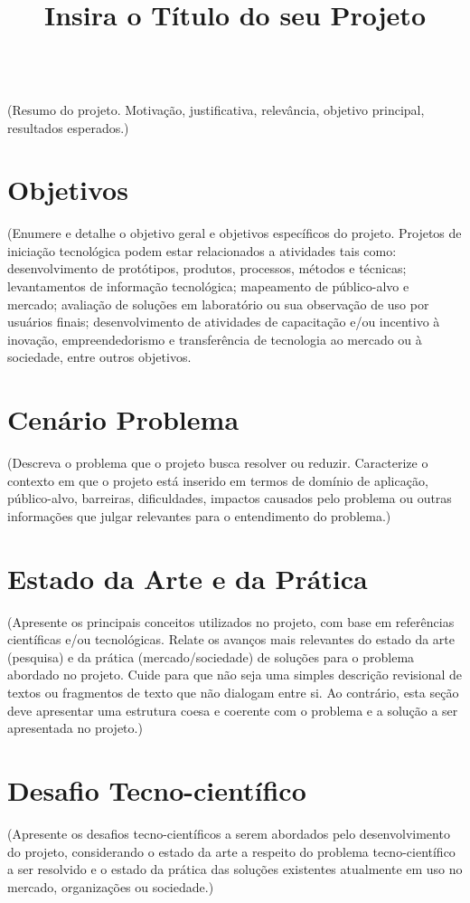 \documentclass[11pt]{article}
\title{Insira o Título do seu Projeto}
\makeatletter
\renewcommand{\maketitle}{\bgroup\setlength{\parindent}{11pt}
\begin{flushleft}
  \MakeUppercase{\textbf{\@title}}
\end{flushleft}\egroup
}
\renewenvironment{abstract}
 {\par\noindent\textbf{\abstractname}\\ \ignorespaces}
 {\par\medskip}
\makeatother
\begin{document}
\maketitle

\begin{abstract}
(Resumo do projeto. Motivação, justificativa, relevância, objetivo principal, resultados
esperados.)
\end{abstract}

\section{Objetivos}
(Enumere e detalhe o objetivo geral e objetivos específicos do projeto. Projetos de iniciação
tecnológica podem estar relacionados a atividades tais como: desenvolvimento de protótipos,
produtos, processos, métodos e técnicas; levantamentos de informação tecnológica;
mapeamento de público-alvo e mercado; avaliação de soluções em laboratório ou sua
observação de uso por usuários finais; desenvolvimento de atividades de capacitação e/ou
incentivo à inovação, empreendedorismo e transferência de tecnologia ao mercado ou à
sociedade, entre outros objetivos.


\section{Cenário Problema}
(Descreva o problema que o projeto busca resolver ou reduzir. Caracterize o contexto em que
o projeto está inserido em termos de domínio de aplicação, público-alvo, barreiras,
dificuldades, impactos causados pelo problema ou outras informações que julgar relevantes
para o entendimento do problema.)


\section{Estado da Arte e da Prática}
(Apresente os principais conceitos utilizados no projeto, com base em referências científicas
e/ou tecnológicas. Relate os avanços mais relevantes do estado da arte (pesquisa) e da prática
(mercado/sociedade) de soluções para o problema abordado no projeto. Cuide para que não
seja uma simples descrição revisional de textos ou fragmentos de texto que não dialogam entre
si. Ao contrário, esta seção deve apresentar uma estrutura coesa e coerente com o problema
e a solução a ser apresentada no projeto.)


\section{Desafio Tecno-científico}
(Apresente os desafios tecno-científicos a serem abordados pelo desenvolvimento do projeto,
considerando o estado da arte a respeito do problema tecno-científico a ser resolvido e o
estado da prática das soluções existentes atualmente em uso no mercado, organizações ou
sociedade.)
\end{document}
